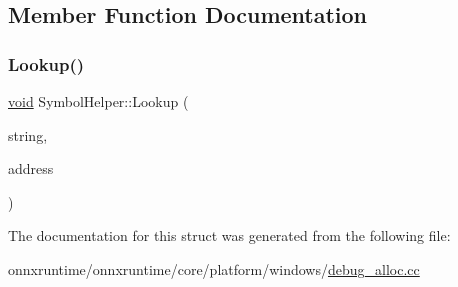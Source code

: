 \subsection{Member Function Documentation}
\mbox{\label{structSymbolHelper_a7835963964cfdd62b524a22175c63458}} 
\subsubsection{\texorpdfstring{Lookup()}{Lookup()}}
{\footnotesize\ttfamily \mbox{\hyperlink{mlasi_8h_a88f941d423cb2a819b70a1358982b1a6}{void}} Symbol\+Helper\+::\+Lookup (\begin{DoxyParamCaption}\item[{std\+::string \&}]{string,  }\item[{const U\+L\+O\+N\+G\+\_\+\+P\+TR}]{address }\end{DoxyParamCaption})\hspace{0.3cm}{\ttfamily [inline]}}



The documentation for this struct was generated from the following file\+:\begin{DoxyCompactItemize}
\item 
onnxruntime/onnxruntime/core/platform/windows/\mbox{\hyperlink{debug__alloc_8cc}{debug\+\_\+alloc.\+cc}}\end{DoxyCompactItemize}
